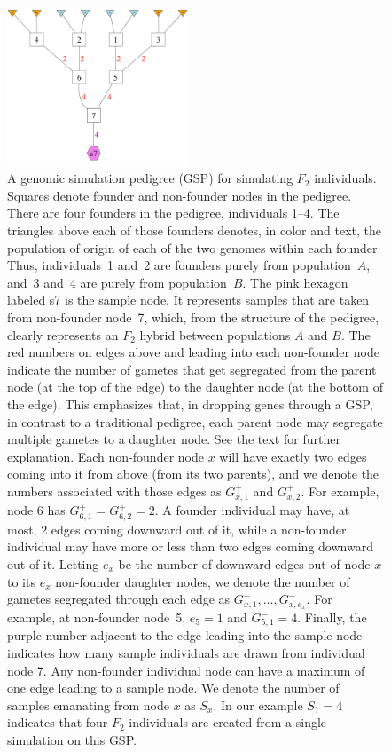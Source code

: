 \begin{figure}
\newcommand{\gspcapone}{\footnotesize
A genomic simulation pedigree (GSP) for simulating $F_2$ individuals.
Squares denote founder and non-founder nodes in the pedigree. There are four founders in the pedigree,
individuals 1--4.  The  triangles above each of those founders denotes, in color
and text, the population of origin of each of the two genomes within each founder.
Thus, individuals~1 and~2 are founders purely from population~$A$, and~3 and~4
are purely from population~$B$.  The pink hexagon labeled s7 is the sample node.
It represents samples that are taken from non-founder node~7, which, from the structure
of the pedigree, clearly represents an $F_2$ hybrid between populations $A$ and $B$.  The red numbers
on edges above and leading into each non-founder node indicate the number of
gametes that get segregated from the parent node (at the top of the edge) to the
daughter node (at the bottom of the edge).
This emphasizes that,
in dropping genes through a GSP, in contrast
to a traditional pedigree, each parent
node may segregate multiple gametes to a daughter node.  See the text for
further explanation.
Each non-founder node $x$ will have exactly two edges coming into it from above
(from its two parents), and we denote the numbers associated with those edges as $G^+_{x,1}$ and $G^+_{x,2}$.
For example, node 6 has $G^+_{6,1}=G^+_{6,2} = 2$.
A founder individual may have, at most, 2 edges coming downward out of it, while a non-founder individual may have more or less than two edges coming downward
out of it.  Letting $e_x$ be the number of downward edges out of node $x$ to its $e_x$
non-founder daughter nodes, we denote the number of gametes segregated
through each edge as $G^{-}_{x, 1},\ldots,G^{-}_{x, e_x}$.  For example, at
non-founder node~5, $e_5 = 1$ and $G^{-}_{5,1}=4$.
Finally, the purple number adjacent to the edge leading into the
sample node indicates how many sample individuals are drawn from individual
node 7. Any non-founder individual node can have a maximum of one edge leading
to a sample node.  We denote the number of samples emanating from node $x$ as $S_x$. In our example $S_7=4$ indicates that four $F_2$ individuals are
created from a single simulation on this GSP.
}
\begin{center}
\includegraphics[width=0.48\textwidth]{figures/F2.pdf}
\end{center}
\caption[\gspcapone]{\gspcapone}
\label{fig:gsp1}
\end{figure}
